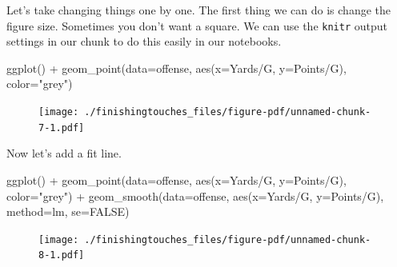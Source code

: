 \documentclass[
  letterpaper,
  DIV=11,
  numbers=noendperiod]{scrreprt}
\newenvironment{Shaded}{\begin{snugshade}}{\end{snugshade}}
\newcommand{\AttributeTok}[1]{\textcolor[rgb]{0.40,0.45,0.13}{#1}}
\newcommand{\ConstantTok}[1]{\textcolor[rgb]{0.56,0.35,0.01}{#1}}
\newcommand{\FunctionTok}[1]{\textcolor[rgb]{0.28,0.35,0.67}{#1}}
\newcommand{\NormalTok}[1]{\textcolor[rgb]{0.00,0.23,0.31}{#1}}
\newcommand{\SpecialCharTok}[1]{\textcolor[rgb]{0.37,0.37,0.37}{#1}}
\newcommand{\StringTok}[1]{\textcolor[rgb]{0.13,0.47,0.30}{#1}}
\begin{document}
Let's take changing things one by one. The first thing we can do is
change the figure size. Sometimes you don't want a square. We can use
the \texttt{knitr} output settings in our chunk to do this easily in our
notebooks.

\begin{Shaded}
\begin{Highlighting}[]
\FunctionTok{ggplot}\NormalTok{() }\SpecialCharTok{+} 
  \FunctionTok{geom\_point}\NormalTok{(}\AttributeTok{data=}\NormalTok{offense, }\FunctionTok{aes}\NormalTok{(}\AttributeTok{x=}\StringTok{\textasciigrave{}}\AttributeTok{Yards/G}\StringTok{\textasciigrave{}}\NormalTok{, }\AttributeTok{y=}\StringTok{\textasciigrave{}}\AttributeTok{Points/G}\StringTok{\textasciigrave{}}\NormalTok{), }\AttributeTok{color=}\StringTok{"grey"}\NormalTok{)}
\end{Highlighting}
\end{Shaded}

\begin{figure}[H]

{\centering \texttt{[image: ./finishingtouches\_files/figure-pdf/unnamed-chunk-7-1.pdf]}

}

\end{figure}

Now let's add a fit line.

\begin{Shaded}
\begin{Highlighting}[]
\FunctionTok{ggplot}\NormalTok{() }\SpecialCharTok{+} 
  \FunctionTok{geom\_point}\NormalTok{(}\AttributeTok{data=}\NormalTok{offense, }\FunctionTok{aes}\NormalTok{(}\AttributeTok{x=}\StringTok{\textasciigrave{}}\AttributeTok{Yards/G}\StringTok{\textasciigrave{}}\NormalTok{, }\AttributeTok{y=}\StringTok{\textasciigrave{}}\AttributeTok{Points/G}\StringTok{\textasciigrave{}}\NormalTok{), }\AttributeTok{color=}\StringTok{"grey"}\NormalTok{) }\SpecialCharTok{+}
  \FunctionTok{geom\_smooth}\NormalTok{(}\AttributeTok{data=}\NormalTok{offense, }\FunctionTok{aes}\NormalTok{(}\AttributeTok{x=}\StringTok{\textasciigrave{}}\AttributeTok{Yards/G}\StringTok{\textasciigrave{}}\NormalTok{, }\AttributeTok{y=}\StringTok{\textasciigrave{}}\AttributeTok{Points/G}\StringTok{\textasciigrave{}}\NormalTok{), }\AttributeTok{method=}\NormalTok{lm, }\AttributeTok{se=}\ConstantTok{FALSE}\NormalTok{)}
\end{Highlighting}
\end{Shaded}

\begin{figure}[H]

{\centering \texttt{[image: ./finishingtouches\_files/figure-pdf/unnamed-chunk-8-1.pdf]}

}

\end{figure}
\end{document}
